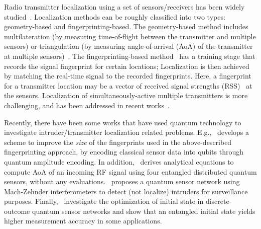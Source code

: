 Radio transmitter localization using a set of sensors/receivers has been
widely studied~\cite{localization-guide, localization-survey, time-19}. 
Localization methods can be roughly classified into two types: geometry-based and fingerprinting-based.
The geometry-based method includes multilateration (by measuring time-of-flight between the transmitter and multiple sensors) or triangulation (by measuring angle-of-arrival (AoA) of the transmitter at multiple sensors)~\cite{nsdi13-arraytrack}.
The fingerprinting-based method~\cite{infocom00-radar} has a training stage that records
the signal fingerprint for certain locations; Localization is then achieved by
matching the real-time signal to the recorded fingerprints. 
Here, a fingerprint for a transmitter location may be a vector of received signal strengths (RSS)~\cite{localization-guide} at the sensors.  
Localization of simultaneously-active multiple transmitters is more challenging,
and has been addressed in recent works~\cite{wowmom, ipsn20-mtl, pmc22-deepmtlpro}.

Recently, there have been some works that have used quantum technology to investigate
intruder/transmitter localization related problems. E.g.,~\cite{lcn22-qloc} develops a scheme
to improve the {\em size} of the fingerprints used in the above-described 
fingerprinting approach, by encoding classical sensor data into qubits 
through quantum amplitude encoding.
In addition,~\cite{PR22-quantum_positioning} derives analytical equations to compute AoA of an
incoming RF signal using four entangled distributed quantum sensors, without any evaluations.~\cite{qsn-detection} proposes a quantum sensor network 
using Mach-Zehnder interferometers to detect (not localize) 
intruders for surveillance purposes.
Finally,~\cite{PhysRevA.quantum_sensors, qsn-acm-23} investigate the optimization of initial state in discrete-outcome quantum sensor networks and show that an entangled initial state yields
higher measurement accuracy in some applications.

